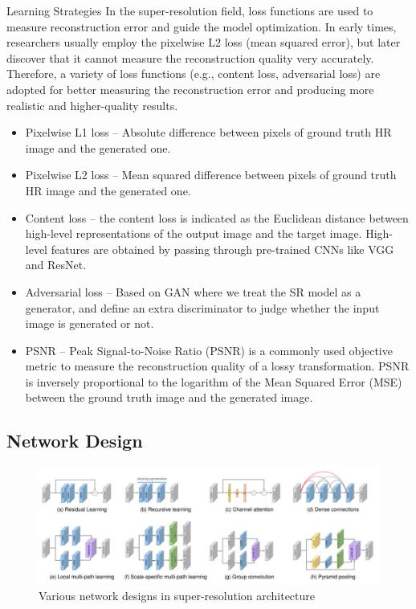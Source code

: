 Learning Strategies
In the super-resolution field, loss functions are used to
measure reconstruction error and guide the model optimization. In early times, researchers usually employ the pixelwise L2 loss (mean squared error), but later discover that it cannot measure the reconstruction quality very accurately. Therefore, a variety
of loss functions (e.g., content loss, adversarial loss) are adopted for better measuring the reconstruction error and producing more realistic and higher-quality results.\\
\begin{itemize}
    \item Pixelwise L1 loss – Absolute difference between pixels of ground truth HR image and the generated one.
    \item Pixelwise L2 loss – Mean squared difference between pixels of ground truth HR image and the generated one.
    \item Content loss – the content loss is indicated as the Euclidean distance between high-level representations of the output image and the target image. High-level features are obtained by passing through pre-trained CNNs like VGG and ResNet.
    \item Adversarial loss – Based on GAN where we treat the SR model as a generator, and define an extra discriminator to judge whether the input image is generated or not.
    \item PSNR – Peak Signal-to-Noise Ratio (PSNR) is a commonly used objective metric to measure the reconstruction quality of a lossy transformation. PSNR is inversely proportional to the logarithm of the Mean Squared Error (MSE) between the ground truth image and the generated image.
\end{itemize}



\subsection{Network Design}
\begin{figure}[H]
    \centering
    \includegraphics[totalheight=1.4in]{Chapter2/image17.jpeg}
    \caption{Various network designs in super-resolution architecture \cite{DLSR}}
    \label{fig:test8}
\end{figure}

